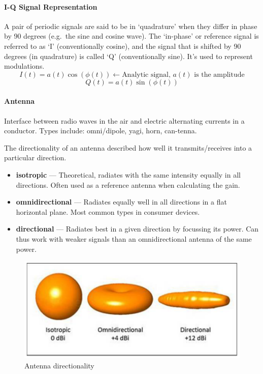 \paragraph{I-Q Signal Representation}
A pair of periodic signals are said to be in `quadrature' when they differ in
phase by 90 degrees (e.g.\ the sine and cosine wave). The `in-phase' or
reference signal is referred to as `I' (conventionally cosine), and the signal
that is shifted by 90 degrees (in quadrature) is called `Q' (conventionally
sine). It's used to represent modulations.
\[ I(t) = a(t) \cos (\phi(t)) \leftarrow  \textrm{Analytic signal, } a(t) \textrm{ is the amplitude}\]
\[ Q(t) = a(t) \sin (\phi(t)) \]

\paragraph{Antenna}
Interface between radio waves in the air and electric alternating currents in a
conductor. Types include: omni/dipole, yagi, horn, can-tenna.

The directionality of an antenna described how well it transmits/receives into
a particular direction.
\begin{itemize}
	\item \textbf{isotropic} --- Theoretical, radiates with the same intensity equally in all directions. Often used as a reference antenna when calculating the gain.
	\item \textbf{omnidirectional} --- Radiates equally well in all directions in a flat horizontal plane. Most common types in consumer devices.
	\item \textbf{directional} --- Radiates best in a given direction by focussing its power. Can thus work with weaker signals than an omnidirectional antenna of the same power.
\end{itemize}

\begin{figure}[h]
	\centering
	\includegraphics[scale=0.4]{images/1-directionality.png}
	\caption{Antenna directionality}%
	\label{fig:directionality}
\end{figure}

